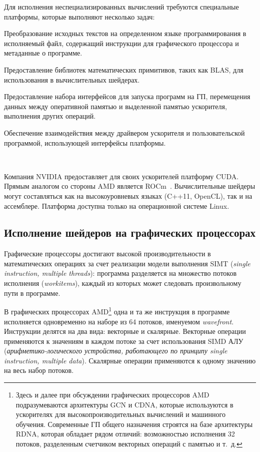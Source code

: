\documentclass[a4paper,14pt]{extarticle}
\begin{document}
Для исполнения неспециализированных вычислений требуются специальные платформы,
которые выполняют несколько задач:
\begin{ul}
\item Преобразование исходных текстов на определенном языке программирования
  в исполняемый файл, содержащий инструкции для графического процессора и метаданные о программе.
\item Предоставление библиотек математических примитивов, таких как BLAS,
  для использования в вычислительных шейдерах.
\item Предоставление набора интерфейсов для запуска программ на ГП, перемещения данных между
  оперативной памятью и выделенной памятью ускорителя, выполнения других операций.
\item Обеспечение взаимодействия между драйвером ускорителя и пользовательской программой,
  использующей интерфейсы платформы.
\end{ul}\ %

Компания NVIDIA предоставляет для своих ускорителей платформу CUDA. Прямым аналогом
со стороны AMD является ROCm~\cite{rocm}. Вычислительные шейдеры могут составляться как
на высокоуровневых языках (C++11, OpenCL), так и на ассемблере. Платформа доступна
только на операционной системе Linux.

\subsection{Исполнение шейдеров на графических процессорах}

Графические процессоры достигают высокой производительности в математических операциях
за счет реализации модели выполнения SIMT (\textit{single instruction, multiple threads}):
программа разделяется на множество потоков исполнения (\textit{workitems}), каждый из которых
может следовать произвольному пути в программе.

В графических процессорах AMD\footnote{Здесь и далее при обсуждении графических процессоров AMD
подразумеваются архитектуры GCN и CDNA, которые используются в ускорителях для высокопроизводительных
вычислений и машинного обучения. Современные ГП общего назначения строятся на базе архитектуры RDNA,
которая обладает рядом отличий: возможностью исполнения 32 потоков, разделенным счетчиком векторных
операций с памятью и т.~д.}
одна и та же инструкция в программе исполняется одновременно на наборе из 64 потоков,
именуемом \textit{wavefront}. Инструкции делятся на два вида: векторные и скалярные.
Векторные операции применяются к значениям в каждом потоке за счет использования SIMD АЛУ
(\textit{арифметико-логического устройства, работающего по принципу
single instruction, multiple data}).
Скалярные операции применяются к одному значению на весь набор потоков.
\end{document}
